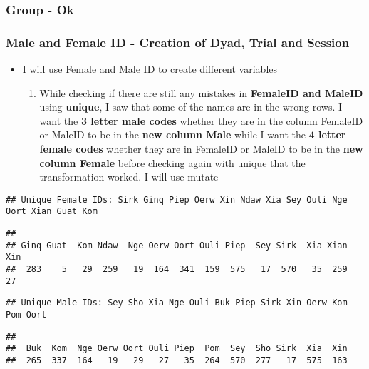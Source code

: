 \documentclass[
]{article}
\providecommand{\tightlist}{%
  \setlength{\itemsep}{0pt}\setlength{\parskip}{0pt}}
\begin{document}
\hypertarget{group---ok}{%
\subsubsection{Group - Ok}\label{group---ok}}

\hypertarget{male-and-female-id---creation-of-dyad-trial-and-session}{%
\subsubsection{Male and Female ID - Creation of Dyad, Trial and
Session}\label{male-and-female-id---creation-of-dyad-trial-and-session}}

\begin{itemize}
\tightlist
\item
  I will use Female and Male ID to create different variables

  \begin{enumerate}
  \def\labelenumi{\arabic{enumi}.}
  \tightlist
  \item
    While checking if there are still any mistakes in \textbf{FemaleID
    and MaleID} using \textbf{unique}, I saw that some of the names are
    in the wrong rows. I want the \textbf{3 letter male codes} whether
    they are in the column FemaleID or MaleID to be in the \textbf{new
    column Male} while I want the \textbf{4 letter female codes} whether
    they are in FemaleID or MaleID to be in the \textbf{new column
    Female} before checking again with unique that the transformation
    worked. I will use mutate
  \end{enumerate}
\end{itemize}

\begin{verbatim}
## Unique Female IDs: Sirk Ginq Piep Oerw Xin Ndaw Xia Sey Ouli Nge Oort Xian Guat Kom
\end{verbatim}

\begin{verbatim}
## 
## Ginq Guat  Kom Ndaw  Nge Oerw Oort Ouli Piep  Sey Sirk  Xia Xian  Xin 
##  283    5   29  259   19  164  341  159  575   17  570   35  259   27
\end{verbatim}

\begin{verbatim}
## Unique Male IDs: Sey Sho Xia Nge Ouli Buk Piep Sirk Xin Oerw Kom Pom Oort
\end{verbatim}

\begin{verbatim}
## 
##  Buk  Kom  Nge Oerw Oort Ouli Piep  Pom  Sey  Sho Sirk  Xia  Xin 
##  265  337  164   19   29   27   35  264  570  277   17  575  163
\end{verbatim}
\end{document}
